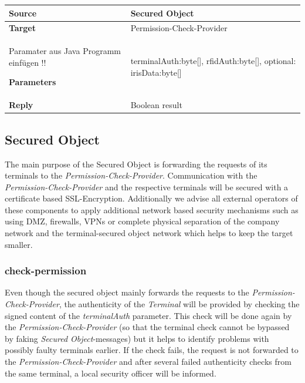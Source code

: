\documentclass[12pt,a4paper,titlepage,oneside]{scrartcl}
\begin{document}
\begin{table}[h]

    \centering

    \begin{tabular}{|l|p{12cm}|} \hline

    \textbf{Source}&Secured Object\\ \hline

    \textbf{Target}&Permission-Check-Provider\\ \hline

Paramater aus Java Programm einfügen !!

    \textbf{Parameters}&terminalAuth:byte[], rfidAuth:byte[], optional: irisData:byte[]\\ \hline

    \textbf{Reply}&Boolean result\\ \hline

    \end{tabular}

\end{table}

\subsection{Secured Object}

The main purpose of the Secured Object is forwarding the requests of its terminals to the \emph{Permission-Check-Provider}. Communication with the \emph{Permission-Check-Provider} and the respective terminals will be secured with a certificate based SSL-Encryption. Additionally we advise all external operators of these components to apply additional network based security mechanisms such as using DMZ, firewalls, VPNs or complete physical separation of the company network and the terminal-secured object network which helps to keep the target smaller.

\subsubsection{check-permission}

Even though the secured object mainly forwards the requests to the \emph{Permission-Check-Provider}, the authenticity of the \emph{Terminal} will be provided by checking the signed content of the \emph{terminalAuth} parameter. This check will be done again by the \emph{Permission-Check-Provider} (so that the terminal check cannot be bypassed by faking \emph{Secured Object}-messages) but it helps to identify problems with possibly faulty terminals earlier. If the check fails, the request is not forwarded to the \emph{Permission-Check-Provider} and after several failed authenticity checks from the same terminal, a local security officer will be informed.
\end{document}
